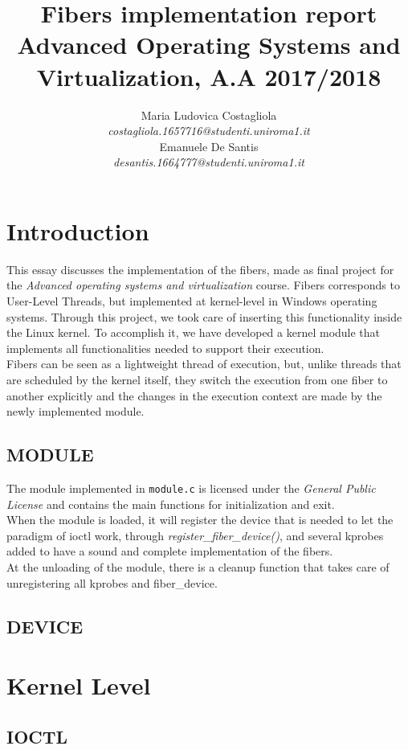 \documentclass[a4paper]{article}
\author{\large Maria Ludovica Costagliola \\
        \small \textit{costagliola.1657716@studenti.uniroma1.it} \medskip\\
        \large Emanuele De Santis \\
        \small \textit{desantis.1664777@studenti.uniroma1.it}}
\title{Fibers implementation report\\
        \smallskip
        \small Advanced Operating Systems and Virtualization, A.A 2017/2018}
\date{}
\begin{document}
\maketitle
\section{Introduction}
This essay discusses the implementation of the fibers, made as final project for the \textit{Advanced operating systems and virtualization} course. Fibers corresponds to User-Level Threads, but implemented at kernel-level in Windows operating systems. Through this project, we took care of inserting this functionality inside the Linux kernel. To accomplish it, we have developed a kernel module that implements all functionalities needed to support their execution.\bigskip\\
Fibers can be seen as a lightweight thread of execution, but, unlike threads that are scheduled by the kernel itself, they switch the execution from one fiber to another explicitly and the changes in the execution context are made by the newly implemented module.

\subsection*{MODULE}
The module implemented in \texttt{module.c} is licensed under the \textit{General Public License} and contains the main functions for initialization and exit.\bigskip\\
When the module is loaded, it will register the device that is needed to let the paradigm of ioctl work, through \textit{register\_fiber\_device()}, and several kprobes added to have a sound and complete implementation of the fibers.\bigskip\\
At the unloading of the module, there is a cleanup function that takes care of unregistering all kprobes and fiber\_device.

\subsection*{DEVICE}

\section{Kernel Level}
\subsection*{IOCTL}
\end{document}
